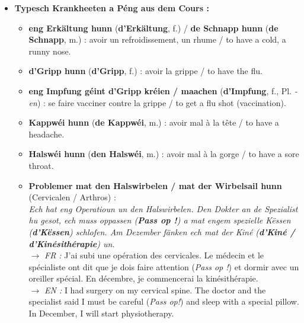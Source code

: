 \begin{itemize}
    \item \textbf{Typesch Krankheeten a Péng aus dem Cours :}
    \begin{itemize}
        \item \textbf{eng Erkältung hunn} (\textbf{d'Erkältung}, f.) / \textbf{de Schnapp hunn} (\textbf{de Schnapp}, m.) : avoir un refroidissement, un rhume / to have a cold, a runny nose.
        \item \textbf{d'Gripp hunn} (\textbf{d'Gripp}, f.) : avoir la grippe / to have the flu.
        \item \textbf{eng Impfung géint d'Gripp kréien / maachen} (\textbf{d'Impfung}, f., Pl. \textit{-en}) : se faire vacciner contre la grippe / to get a flu shot (vaccination).
        \item \textbf{Kappwéi hunn} (\textbf{de Kappwéi}, m.) : avoir mal à la tête / to have a headache.
        \item \textbf{Halswéi hunn} (\textbf{den Halswéi}, m.) : avoir mal à la gorge / to have a sore throat.
        \item \textbf{Problemer mat den Halswirbelen / mat der Wirbelsail hunn} (Cervicalen / Arthros) : \\
        \textit{Ech hat eng Operatioun un den Halswirbelen. Den Dokter an de Spezialist hu gesot, ech muss oppassen (\textbf{Pass op !}) a mat engem spezielle Këssen (\textbf{d'Këssen}) schlofen. Am Dezember fänken ech mat der Kiné (\textbf{d'Kiné / d'Kinésithérapie}) un.} \\
        $\rightarrow$ \textit{FR :} J'ai subi une opération des cervicales. Le médecin et le spécialiste ont dit que je dois faire attention (\textit{Pass op !}) et dormir avec un oreiller spécial. En décembre, je commencerai la kinésithérapie. \\
        $\rightarrow$ \textit{EN :} I had surgery on my cervical spine. The doctor and the specialist said I must be careful (\textit{Pass op!}) and sleep with a special pillow. In December, I will start physiotherapy.
    \end{itemize}

    \vspace{0.4em}


\end{itemize}
